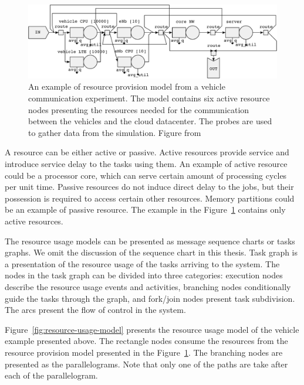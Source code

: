 \begin{figure}[]
  \begin{center}
    \includegraphics[width=\textwidth]{images/pse-models/pse-rn-example.pdf}
    \caption{An example of resource provision model from a vehicle communication experiment. The model contains six active resource nodes presenting the resources needed for the communication between the vehicles and the cloud datacenter. The probes are used to gather data from the simulation. Figure from~\cite{Hanhirova:2014:PSE}}
    \label{fig:resource-provision-model}
  \end{center}
\end{figure}

A resource can be either active or passive. Active resources provide service and introduce service delay to the tasks using them. An example of active resource could be a processor core, which can serve certain amount of processing cycles per unit time. Passive resources do not induce direct delay to the jobs, but their possession is required to access certain other resources. Memory partitions could be an example of passive resource. The example in the Figure~\ref{fig:resource-provision-model} contains only active resources.

The resource usage models can be presented as message sequence charts or tasks graphs. We omit the discussion of the sequence chart in this thesis. Task graph is a presentation of the resource usage of the tasks arriving to the system. The nodes in the task graph can be divided into three categories: execution nodes describe the resource usage events and activities, branching nodes conditionally guide the tasks through the graph, and fork/join nodes present task subdivision. The arcs present the flow of control in the system.

Figure~\ref{fig:resource-usage-model} presents the resource usage model of the vehicle example presented above. The rectangle nodes consume the resources from the resource provision model presented in the Figure~\ref{fig:resource-provision-model}. The branching nodes are presented as the parallelograms. Note that only one of the paths are take after each of the parallelogram.

